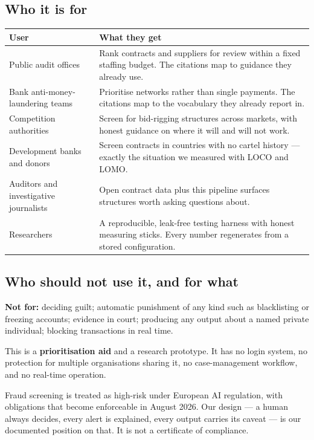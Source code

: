 \documentclass[11pt,a4paper]{article}
\begin{document}
\subsection{Who it is for}

\begin{longtable}{@{}p{4.3cm}p{11.2cm}@{}}
\toprule
\textbf{User} & \textbf{What they get} \\
\midrule
\endhead
Public audit offices & Rank contracts and suppliers for review within a fixed
staffing budget. The citations map to guidance they already use. \\
Bank anti-money-laundering teams & Prioritise networks rather than single
payments. The citations map to the vocabulary they already report in. \\
Competition authorities & Screen for bid-rigging structures across markets, with
honest guidance on where it will and will not work. \\
Development banks and donors & Screen contracts in countries with no cartel
history --- exactly the situation we measured with LOCO and LOMO. \\
Auditors and investigative journalists & Open contract data plus this pipeline
surfaces structures worth asking questions about. \\
Researchers & A reproducible, leak-free testing harness with honest measuring
sticks. Every number regenerates from a stored configuration. \\
\bottomrule
\end{longtable}

\subsection{Who should not use it, and for what}

\begin{warnbox}
\textbf{Not for:} deciding guilt; automatic punishment of any kind such as
blacklisting or freezing accounts; evidence in court; producing any output about
a named private individual; blocking transactions in real time.

This is a \textbf{prioritisation aid} and a research prototype. It has no login
system, no protection for multiple organisations sharing it, no case-management
workflow, and no real-time operation.

Fraud screening is treated as high-risk under European AI regulation, with
obligations that become enforceable in August 2026. Our design --- a human always
decides, every alert is explained, every output carries its caveat --- is our
documented position on that. It is not a certificate of compliance.
\end{warnbox}
\end{document}
